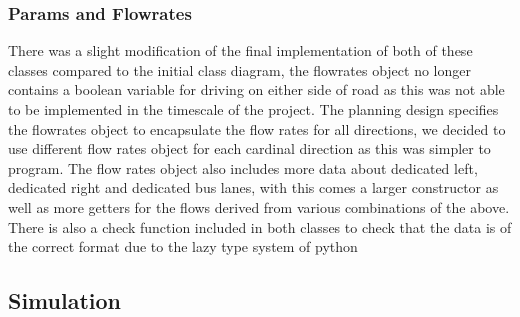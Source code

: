 \documentclass{article}
\begin{document}
    \subsubsection{Params and Flowrates}

    There was a slight modification of the final implementation of both of these classes compared to the initial class
    diagram, the flowrates object no longer contains a boolean variable for driving on either side of road as this was
    not able to be implemented in the timescale of the project. The planning design specifies the flowrates object to
    encapsulate the flow rates for all directions, we decided to use different flow rates object for each cardinal
    direction as this was simpler to program. The flow rates object also includes more data about dedicated left,
    dedicated right and dedicated bus lanes, with this comes a larger constructor as well as more getters for the
    flows derived from various combinations of the above. There is also a check function included in both classes to
    check that the data is of the correct format due to the lazy type system of python

    \subsection{Simulation}
\end{document}
